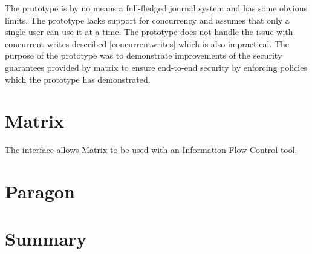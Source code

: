 The prototype is by no means a full-fledged journal system and has some obvious limits. The prototype lacks support for concurrency and assumes that only a single user can use it at a time. The prototype does not handle the issue with concurrent writes described \ref{concurrentwrites} which is also impractical. The purpose of the prototype was to demonstrate improvements of the security guarantees provided by matrix to ensure end-to-end security by enforcing policies which the prototype has demonstrated.


\section{Matrix}
The interface allows Matrix to be used with an Information-Flow Control tool.




\section{Paragon}









% 


\section{Summary}
